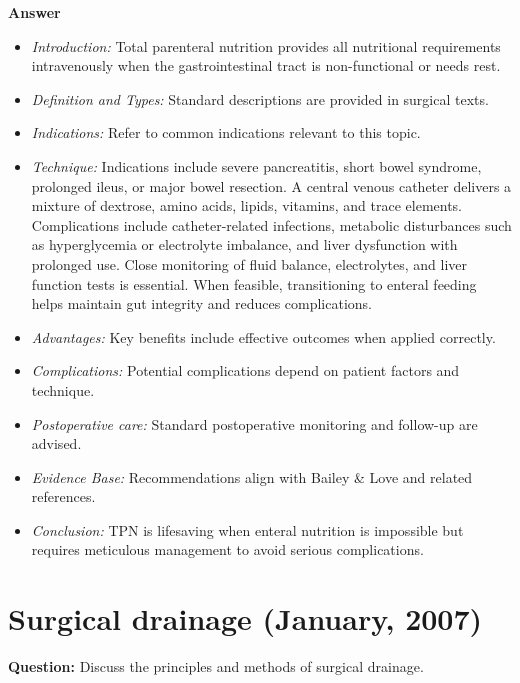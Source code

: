 \documentclass{article}
\begin{document}
\textbf{Answer}
\begin{itemize}

\item \emph{Introduction:} Total parenteral nutrition provides all nutritional requirements intravenously when the gastrointestinal tract is non-functional or needs rest.
\item \emph{Definition and Types:} Standard descriptions are provided in surgical texts.
\item \emph{Indications:} Refer to common indications relevant to this topic.

\item \emph{Technique:} Indications include severe pancreatitis, short bowel syndrome, prolonged ileus, or major bowel resection. A central venous catheter delivers a mixture of dextrose, amino acids, lipids, vitamins, and trace elements. Complications include catheter-related infections, metabolic disturbances such as hyperglycemia or electrolyte imbalance, and liver dysfunction with prolonged use. Close monitoring of fluid balance, electrolytes, and liver function tests is essential. When feasible, transitioning to enteral feeding helps maintain gut integrity and reduces complications.
\item \emph{Advantages:} Key benefits include effective outcomes when applied correctly.
\item \emph{Complications:} Potential complications depend on patient factors and technique.
\item \emph{Postoperative care:} Standard postoperative monitoring and follow-up are advised.
\item \emph{Evidence Base:} Recommendations align with Bailey \& Love and related references.

\item \emph{Conclusion:} TPN is lifesaving when enteral nutrition is impossible but requires meticulous management to avoid serious complications.


\end{itemize}

\section{Surgical drainage (January, 2007)}

\textbf{Question:} Discuss the principles and methods of surgical drainage.
\end{document}
